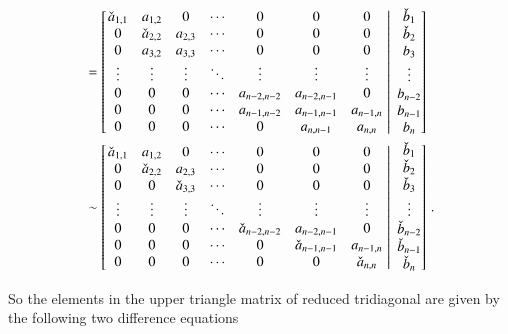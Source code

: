 \documentclass[11pt,english,a4paper]{article}
\begin{document}
\begin{flushleft}
\begin{align*}
&=  \left[{\left.\begin{matrix} \check a_{1,1} & a_{1,2} & 0 & \cdots & 0 & 0 & 0 \\ 0 &  \check a_{2,2} & a_{2,3} & \cdots & 0 & 0 & 0\\ 0 & a_{3,2} & a_{3,3} & \cdots & 0 & 0 & 0\\ \vdots & \vdots & \vdots  & \ddots & \vdots & \vdots & \vdots \\ 0 & 0 & 0 & \cdots & a_{n-2,n-2} & a_{n-2,n-1} & 0 \\ 0 & 0 & 0 & \cdots & a_{n-1,n-2} & a_{n-1,n-1} & a_{n-1,n} \\ 0 & 0 & 0 &\cdots & 0 & a_{n,n-1} & a_{n,n} \end{matrix}\,\,\right\vert\,\,\begin{matrix} \check b_1 \\ \check b_2\\ b_3 \\ \vdots \\ b_{n-2} \\ b_{n-1} \\ b_n\end{matrix}}\right]
\\
&\sim  \left[{\left.\begin{matrix} \check a_{1,1} & a_{1,2} & 0 & \cdots & 0 & 0 & 0 \\ 0 &  \check a_{2,2} & a_{2,3} & \cdots & 0 & 0 & 0\\ 0 & 0 & \check a_{3,3} & \cdots & 0 & 0 & 0\\ \vdots & \vdots & \vdots  & \ddots & \vdots & \vdots & \vdots \\ 0 & 0 & 0 & \cdots & \check a_{n-2,n-2} & a_{n-2,n-1} & 0 \\ 0 & 0 & 0 & \cdots & 0 & \check a_{n-1,n-1} & a_{n-1,n} \\ 0 & 0 & 0 &\cdots & 0 & 0 & \check a_{n,n} \end{matrix}\,\,\right\vert\,\,\begin{matrix} \check b_1 \\ \check b_2\\ \check b_3 \\ \vdots \\ \check b_{n-2} \\ \check b_{n-1} \\ \check b_n\end{matrix}}\right] \,.
\end{align*}

So the elements in the upper triangle matrix of reduced tridiagonal are given by the following two difference equations


\end{flushleft}
\end{document}

